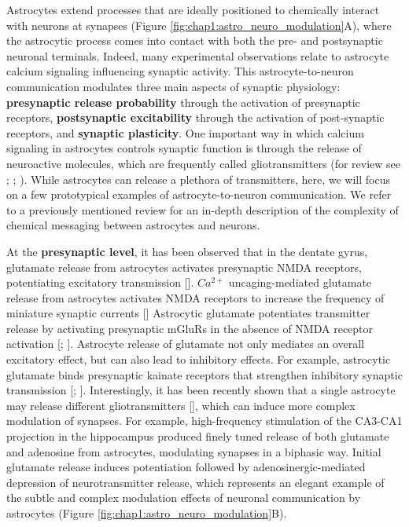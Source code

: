 Astrocytes extend processes that are ideally positioned to chemically interact with neurons at synapses (Figure \ref{fig:chap1:astro_neuro_modulation}A), where the astrocytic process comes into contact with both the pre- and postsynaptic neuronal terminals. 
Indeed, many experimental observations relate to astrocyte calcium signaling influencing synaptic activity. 
This astrocyte-to-neuron communication modulates three main aspects of synaptic physiology: \textbf{presynaptic release probability} through the activation of presynaptic receptors, \textbf{postsynaptic excitability} through the activation of post-synaptic receptors, and \textbf{synaptic plasticity}.
One important way in which calcium signaling in astrocytes controls synaptic function is through the release of neuroactive molecules, which are frequently called gliotransmitters (for review see \cite{araque2001dynamic}; \cite{araque2014gliotransmitters}; \cite{volterra2014astrocyte}). 
While astrocytes can release a plethora of transmitters, here, we will focus on a few prototypical examples of astrocyte-to-neuron communication. 
We refer to a previously mentioned review for an in-depth description of the complexity of chemical messaging between astrocytes and neurons.

At the \textbf{presynaptic level}, it has been observed that in the dentate gyrus, glutamate release from astrocytes activates presynaptic NMDA receptors, potentiating excitatory transmission [\cite{jourdain2007}].
$Ca^{2+}$ uncaging-mediated glutamate release from astrocytes activates NMDA receptors to increase the frequency of miniature synaptic currents [\cite{araque1998}] 
Astrocytic glutamate potentiates transmitter release by activating presynaptic mGluRs in the absence of NMDA receptor activation [\cite{perea2007}; \cite{navarrete2010}].
Astrocyte release of glutamate not only mediates an overall excitatory effect, but can also lead to inhibitory effects.
For example, astrocytic glutamate  binds presynaptic kainate receptors that strengthen inhibitory synaptic transmission [\cite{kang1998}; \cite{liu2004}].
Interestingly, it has been recently shown that a single astrocyte may release different gliotransmitters [\cite{covelo2018}], which can induce more complex modulation of synapses. 
For example, high-frequency stimulation of the CA3-CA1 projection in the hippocampus produced finely tuned release of both glutamate and adenosine from astrocytes, modulating synapses in a biphasic way.
Initial glutamate release induces potentiation followed by adenosinergic-mediated depression of neurotransmitter release, which represents an elegant example of the subtle and complex modulation effects of neuronal communication by astrocytes (Figure \ref{fig:chap1:astro_neuro_modulation}B). 

